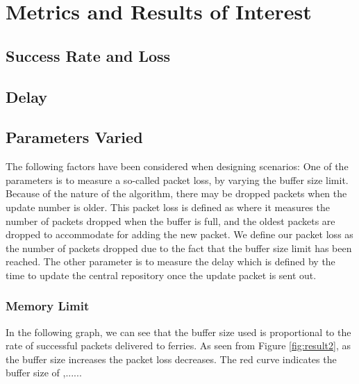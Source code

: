 \section{Metrics and Results of Interest }
\label{sec:metrics}


\subsection{Success Rate and Loss}

\subsection{Delay}
%	

\subsection{Parameters Varied} %

The following factors have been considered when designing scenarios:
One of the parameters is to measure a so-called packet loss, by varying the buffer size limit.
Because of the nature of the algorithm, there may be dropped packets when the update number is older.
This packet loss is defined as where it measures the number of packets dropped when the buffer is full, and the oldest packets are dropped to accommodate for adding the new packet.  
We define our packet loss as the number of packets dropped due to the fact that the buffer size limit has been reached.
The other parameter is to measure the delay which is defined by the time to update the central repository once the update packet is sent out.

\subsubsection{Memory Limit}
In the following graph, we can see that the buffer size used is proportional to the rate of successful packets delivered to ferries.
As seen from Figure \ref{fig:result2}, as the buffer size increases the packet loss decreases.
The red curve indicates the buffer size of ,......

